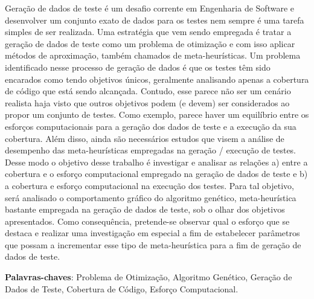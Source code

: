 \begin{resumo}
 
Geração de dados de teste é um desafio corrente em Engenharia de Software e
desenvolver um conjunto exato de dados para os testes nem sempre é uma tarefa
simples de ser realizada.  Uma estratégia que vem sendo empregada é tratar a
geração de dados de teste como um problema de otimização e com isso aplicar
métodos de aproximação, também chamados de meta-heurísticas. Um problema
identificado nesse processo de geração de dados é que os testes têm sido
encarados como tendo objetivos únicos, geralmente analisando apenas a cobertura
de código que está sendo alcançada. Contudo, esse parece não ser um cenário
realista haja visto que outros objetivos podem (e devem) ser considerados ao
propor um conjunto de testes. Como exemplo, parece haver um equilíbrio entre os
esforços computacionais para a geração dos dados de teste e a execução da sua
cobertura.  Além disso, ainda são necessários estudos que visem a análise de
desempenho das meta-heurísticas empregadas na geração / execução de testes.
Desse modo o objetivo desse trabalho é investigar e analisar as relações a)
entre a cobertura e o esforço computacional empregado na geração de dados de
teste e b) a cobertura e esforço computacional na execução dos testes. Para tal
objetivo, será analisado o comportamento gráfico do algoritmo genético,
meta-heurística bastante empregada na geração de dados de teste, sob o olhar dos
objetivos apresentados. Como consequência, pretende-se observar qual o esforço
que se destaca e realizar uma investigação em especial a fim de estabelecer
parâmetros que possam a incrementar esse tipo de meta-heurística para a fim de
geração de dados de teste.

 \vspace{\onelineskip}
    
 \noindent
 \textbf{Palavras-chaves}: Problema de Otimização, Algoritmo Genético, Geração de Dados de Teste, Cobertura de Código, Esforço Computacional.
\end{resumo}
